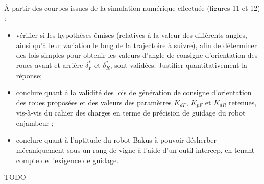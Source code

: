\documentclass[11pt]{article}
\begin{document}
\UPSTIquestion  À partir des courbes issues de la simulation numérique effectuée (figures 11 et 12) :
\begin{itemize}
\item vérifier si les hypothèses émises (relatives à la valeur des différents angles, ainsi qu’à leur variation le long
de la trajectoire à suivre), afin de déterminer des lois simples pour obtenir les valeurs d’angle de consigne
d’orientation des roues avant et arrière $\delta_F^*$ et $\delta_R^*$, sont validées. Justifier quantitativement la réponse;
\item conclure quant à la validité des lois de génération de consigne d’orientation des roues proposées et des valeurs
des paramètres $K_{dF}$, $K_{pF}$ et $K_{dR}$ retenues, vis-à-vis du cahier des charges en terme de précision de guidage du robot enjambeur ;
\item conclure quant à l’aptitude du robot Bakus à pouvoir désherber mécaniquement sous un rang de vigne à
l’aide d’un outil intercep, en tenant compte de l’exigence de guidage.
\end{itemize}

\begin{UPSTIcorrige}
TODO
\end{UPSTIcorrige}




%
%
%
%
%
%
%
%
%
%
%
%
%
%
\end{document}
